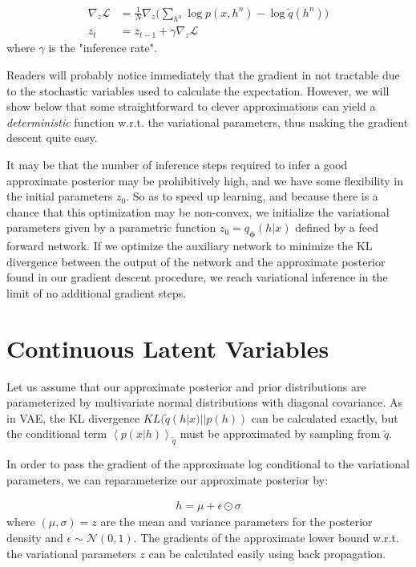 \documentclass[preprint, twocolumn]{article}
\newcommand{\qexp}[1]{\left<#1\right>}
\newcommand{\vects}[1]{\boldsymbol{#1}}
\newcommand{\PP}[0]{\vects{\phi}}
\newcommand{\grad}[0]{\nabla}
\newcommand{\LL}[0]{\mathcal{L}}
\newcommand{\NN}[0]{\mathcal{N}}
\begin{document}
\begin{align}
\grad_z \LL &= \frac{1}{N} \grad_z \big(\sum_{h^n} \log p(x, h^n) - \log \tilde{q}(h^n)\big) \nonumber \\
z_t &= z_{t-1} + \gamma \grad_z \LL 
\end{align}
where $\gamma$ is the "inference rate".

Readers will probably notice immediately that the gradient in not tractable due to the stochastic variables used to calculate the expectation. However, we will show below that some straightforward to clever approximations can yield a \emph{deterministic} function w.r.t. the variational parameters, thus making the gradient descent quite easy.

It may be that the number of inference steps required to infer a good approximate posterior may be prohibitively high, and we have some flexibility in the initial parameters $z_0$. So as to speed up learning, and because there is a chance that this optimization may be non-convex, we initialize the variational parameters given by a parametric function $z_0 = q_{\PP}(h|x)$ defined by a feed forward network. If we optimize the auxiliary network to minimize the KL divergence between the output of the network and the approximate posterior found in our gradient descent procedure, we reach variational inference in the limit of no additional gradient steps.

\section{Continuous Latent Variables}

Let us assume that our approximate posterior and prior distributions are parameterized by multivariate normal distributions with diagonal covariance. As in VAE, the KL divergence $KL(\tilde{q}(h|x) || p(h))$ can be calculated exactly, but the conditional term $\qexp{p(x|h)}_{\tilde{q}}$ must be approximated by sampling from $\tilde{q}$. 

In order to pass the gradient of the approximate log conditional to the variational parameters, we can reparameterize our approximate posterior by:

\begin{align}
h = \mu + \epsilon \odot \sigma
\end{align}
where $(\mu, \sigma) = z$ are the mean and variance parameters for the posterior density and $\epsilon \sim \NN(0, 1)$. The gradients of the approximate lower bound w.r.t. the variational parameters $z$ can be calculated easily using back propagation.
\end{document}
